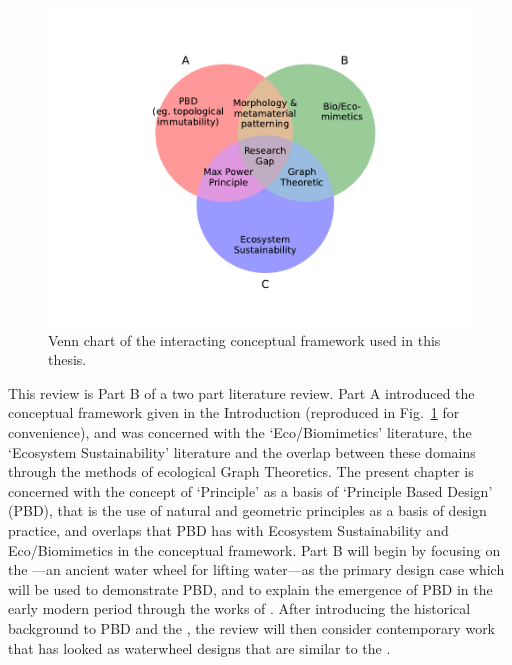 \documentclass[a4paper, 12pt]{article}
\begin{document}
\begin{figure}[H]
    \centering
    \includegraphics[width=0.7\linewidth]{ven}
    \caption{Venn chart of the interacting conceptual framework used in this thesis.}
    \label{fig:conceptual:framework}
\end{figure}

This review is Part B of a two part literature review. Part A introduced the conceptual framework given in the Introduction (reproduced in Fig.~\ref{fig:conceptual:framework} for convenience), and was concerned with the `Eco/Biomimetics' literature, the `Ecosystem Sustainability' literature and the overlap between these domains through the methods of ecological Graph Theoretics. The present chapter is concerned with the concept of `Principle' as a basis of `Principle Based Design' (PBD), that is the use of natural and geometric principles as a basis of design practice, and overlaps that PBD has with Ecosystem Sustainability and Eco/Biomimetics in the conceptual framework. Part B will begin by focusing on the \SE---an ancient water wheel for lifting water---as the primary design case which will be used to demonstrate PBD, and to explain the emergence of PBD in the early modern period through the works of \citeauthor{descartes_principles_1982}. After introducing the historical background to PBD and the \SE, the review will then consider contemporary work that has looked as waterwheel designs that are similar to the \SE.


\end{document}
